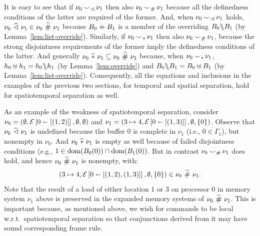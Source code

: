 \documentclass[11pt]{report}
\begin{document}
It is easy to see that if $\nu_0 \operatorname{\smile}_\vartriangleleft \nu_1$ then also $\nu_0 \operatorname{\smile}_\# \nu_1$ because all the definedness conditions of the latter are required of the former. And, when $\nu_0 \operatorname{\smile}_\vartriangleleft \nu_1$ holds, $\nu_0 \operatorname{\,\widehat{\vartriangleleft}\,} \nu_1 \in \nu_0 \operatorname{\,\widehat{\#}\,} \nu_1$ because $B_0 \operatorname{+\!\!\!+} B_1$ is a member of the overriding $B_0 \backslash\!\!\backslash B_1$ (by Lemma~\ref{lem:list-override}). Similarly, if $\nu_0 \operatorname{\smile}_\ast \nu_1$ then also $\nu_0 \operatorname{\smile}_\# \nu_1$, because the strong disjointness requirements of the former imply the definedness conditions of the latter. And generally $\nu_0 \operatorname{\,\widehat{\ast}\,} \nu_1 \subseteq \nu_0 \operatorname{\,\widehat{\#}\,} \nu_1$ because, when $\nu_0 \operatorname{\smile}_\ast \nu_1$, $h_0 \uplus h_1 = h_0 \backslash\!\!\backslash h_1$ (by Lemma~\ref{lem:override}) and $B_0 \backslash\!\!\backslash B_1 = B_0 \uplus B_1$ (by Lemma~\ref{lem:list-override}). Consequently, all the equations and inclusions in the examples of the previous two sections, for temporal and spatial separation, hold for spatiotemporal separation as well. 

As an example of the weakness of spatiotemporal separation, consider $\nu_0 = (\operatorname{\emptyset},\mathcal{E} \left[ 0 \shortleftarrow \left[(1,2)\right] \right],\operatorname{\emptyset},\operatorname{\emptyset})$ and $\nu_1 = (3 \mapsto 4,\mathcal{E} \left[ 0 \shortleftarrow \left[(1,3)\right] \right],\operatorname{\emptyset},\left\lbrace 0 \right\rbrace)$. Observe that $\nu_0 \operatorname{\,\widehat{\vartriangleleft}\,} \nu_1$ is undefined because the buffer 0 is complete in $\nu_1$ (i.e., $0 \in \Gamma_1$), but nonempty in $\nu_0$. And $\nu_0 \operatorname{\,\widehat{\ast}\,} \nu_1$ is empty as well because of failed disjointness conditions (e.g., $1 \in \operatorname{\mathrm{dom}}(B_0(0)) \cap \operatorname{\mathrm{dom}}(B_1(0))$. But in contrast $\nu_0 \operatorname{\smile}_\# \nu_1$ does hold, and hence $\nu_0 \operatorname{\,\widehat{\#}\,} \nu_1$ is nonempty, with: \[ (3 \mapsto 4,\mathcal{E} \left[ 0 \shortleftarrow \left[(1,2),(1,3)\right] \right],\operatorname{\emptyset},\left\lbrace 0 \right\rbrace) \in \nu_0 \operatorname{\,\widehat{\#}\,} \nu_1.\] Note that the result of a load of either location $1$ or $3$ on processor 0 in memory system $\nu_1$ above is preserved in the expanded memory systems of $\nu_0 \operatorname{\,\widehat{\#}\,} \nu_1$. This is important because, as mentioned above, we wish for commands to be local w.r.t.\ spatiotemporal separation so that conjunctions derived from it may have sound corresponding frame rule. 
\end{document}
